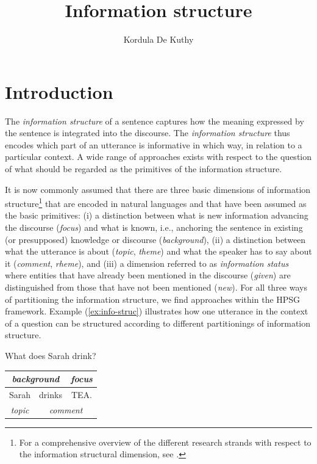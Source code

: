 \documentclass[output=paper]{langsci/langscibook}
\author{Kordula De Kuthy\affiliation{Universität Tübingen}}
\title{Information structure}
\begin{document}
\label{chap-information-structure}



\section{Introduction} 


The \textit{information structure} of a sentence captures how the meaning
expressed by the sentence is integrated into the discourse.
The \textit{information structure} thus encodes which part of an
  utterance is informative in which way, in relation to a particular context.
A wide range of approaches exists with respect to the question of what
should be regarded as the primitives of the information structure.

It is now commonly assumed that there are three basic dimensions of
information structure\footnote{For a comprehensive overview of the different research strands with respect to the information structural dimension, see \citet{KruijffSteedman2003}.} that are encoded in natural languages and that
have been assumed as the basic primitives: (i) a distinction between
what is new information advancing the discourse (\emph{focus}) and
what is known, i.e., anchoring the sentence in existing (or
presupposed) knowledge or discourse (\emph{background}), (ii) a
distinction between what the utterance is about (\emph{topic},
\emph{theme}) and what the speaker has to say about it
(\emph{comment}, \emph{rheme}), and (iii) a dimension referred to as
\textit{information status} where entities that have already been
mentioned in the discourse (\textit{given}) are distinguished from
those that have not been mentioned (\emph{new}). For all three ways of
partitioning the information structure, we find approaches within the
HPSG framework.  Example (\ref{ex:info-struc}) illustrates how one
utterance in the context of a question can be structured according to
different partitionings of information structure.
\begin{exe}
\ex\label{ex:info-struc}
\begin{xlist}
  What does Sarah drink?
  \begin{tabular}[c]{|c|c|c|}
\multicolumn{2}{c|}{\small\textsl{background}} & \multicolumn{1}{c}{\small\textsl{focus}}\\\hline 
Sarah & drinks & TEA.\\\hline
\multicolumn{1}{c|}{\small\textsl{topic}} & \multicolumn{2}{c}{\small\textsl{comment}}\\
  \end{tabular}
\end{xlist}

\end{exe}
\end{document}
